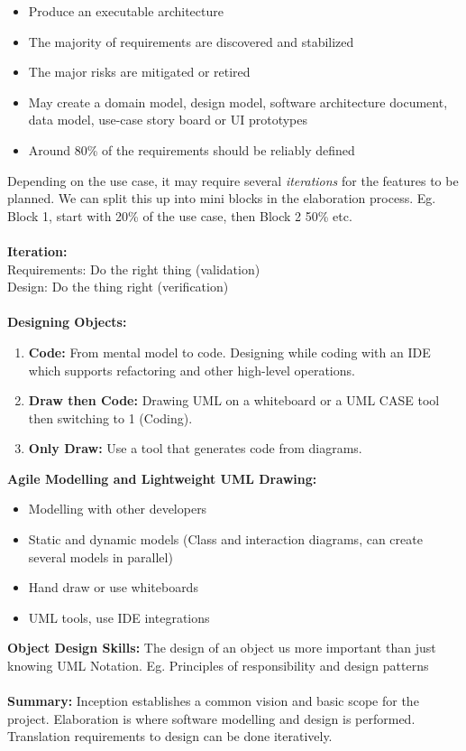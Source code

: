\documentclass[a4paper,10pt]{article}
\begin{document}
\renewcommand{\labelitemi}{\textperiodcentered}
\begin{itemize}
\item Produce an executable architecture 
\item The majority of requirements are discovered and stabilized 
\item The major risks are mitigated or retired 
\item May create a domain model, design model, software architecture document, data model, use-case story board or UI prototypes 
\item Around 80\% of the requirements should be reliably defined 
\end{itemize}
Depending on the use case, it may require several \emph{iterations} for the features to be planned. We can split this up into mini blocks in the elaboration process. Eg. Block 1, start with 20\% of the use case, then Block 2 50\% etc.  \\\\
\textcolor{Rhodamine}{\textbf{Iteration:}}\\
\indent Requirements: Do the right thing (validation) \\ 
\indent Design: Do the thing right (verification)\\\\
\textcolor{Rhodamine}{\textbf{Designing Objects:}}
\begin{enumerate}
\item \textbf{Code:} From mental model to code. Designing while coding with an IDE which supports refactoring and other high-level operations. 
\item \textbf{Draw then Code:} Drawing UML on a whiteboard or a UML CASE tool then switching to 1 (Coding). 
\item \textbf{Only Draw:} Use a tool that generates code from diagrams. 
\end{enumerate}
\textcolor{Rhodamine}{\textbf{Agile Modelling and Lightweight UML Drawing:}}
\renewcommand{\labelitemi}{\textperiodcentered}
\begin{itemize}
\item Modelling with other developers 
\item Static and dynamic models (Class and interaction diagrams, can create several models in parallel)
\item Hand draw or use whiteboards
\item UML tools, use IDE integrations 
\end{itemize}
\textcolor{Rhodamine}{\textbf{Object Design Skills:}} The design of an object us more important than just knowing UML Notation. Eg. Principles of responsibility and design patterns\\\\
\textcolor{Rhodamine}{\textbf{Summary:}} Inception establishes a common vision and basic scope for the project. Elaboration is where software modelling and design is performed. Translation requirements to design can be done iteratively.\\\\
\end{document}
